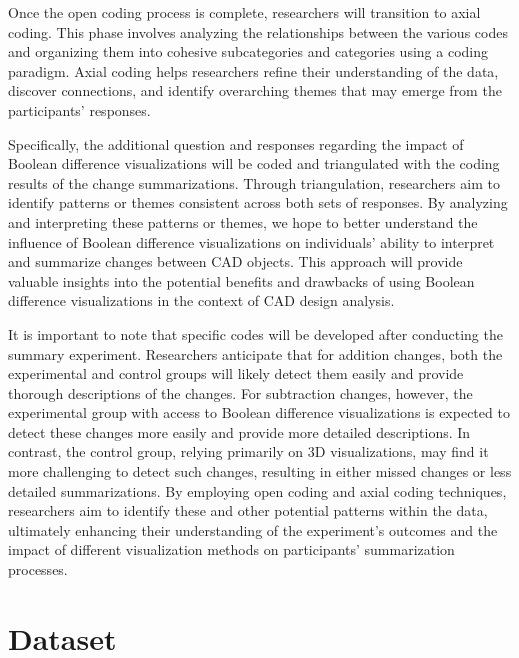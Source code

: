 \documentclass[sigconf,authorversion,nonacm]{acmart}
\begin{document}
Once the open coding process is complete, researchers will transition to axial coding. This phase involves analyzing the relationships between the various codes and organizing them into cohesive subcategories and categories using a coding paradigm.
Axial coding helps researchers refine their understanding of the data, discover connections, and identify overarching themes that may emerge from the participants' responses.

Specifically, the additional question and responses regarding the impact of Boolean difference visualizations will be coded and triangulated with the coding results of the change summarizations.
Through triangulation, researchers aim to identify patterns or themes consistent across both sets of responses. By analyzing and interpreting these patterns or themes, we hope to better understand the influence of Boolean difference visualizations on individuals' ability to interpret and summarize changes between CAD objects.
This approach will provide valuable insights into the potential benefits and drawbacks of using Boolean difference visualizations in the context of CAD design analysis.

It is important to note that specific codes will be developed after conducting the summary experiment. Researchers anticipate that for addition changes, both the experimental and control groups will likely detect them easily and provide thorough descriptions of the changes. 
For subtraction changes, however, the experimental group with access to Boolean difference visualizations is expected to detect these changes more easily and provide more detailed descriptions. 
In contrast, the control group, relying primarily on 3D visualizations, may find it more challenging to detect such changes, resulting in either missed changes or less detailed summarizations. 
By employing open coding and axial coding techniques, researchers aim to identify these and other potential patterns within the data, ultimately enhancing their understanding of the experiment's outcomes and the impact of different visualization methods on participants' summarization processes.


\section{Dataset}
\end{document}
